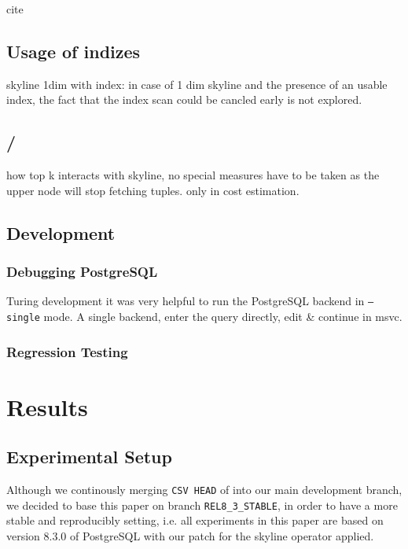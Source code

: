 cite \citep{Buchta1989}

\section{Usage of indizes}
skyline 1dim with index: in case of 1 dim skyline and the presence of an usable index, the fact that the index scan could be cancled early is not explored.

\section{ / }
how top k interacts with skyline, no special measures have to be taken as the upper node will stop fetching tuples. only in cost estimation.


\section{Development}
\subsection{Debugging PostgreSQL}
Turing development it was very helpful to run the PostgreSQL backend in \texttt{--single} mode. A single backend, enter the query directly, edit \& continue in msvc.


\subsection{Regression Testing}

\chapter{Results}
\label{chap:Results}


\section{Experimental Setup}

Although we continously merging \texttt{CSV HEAD} of  into our main development branch, we decided
to base this paper on branch \texttt{REL8\_3\_STABLE}, in order to
have a more stable and reproducibly setting, i.e. all experiments in
this paper are based on version 8.3.0 of PostgreSQL with our patch for
the skyline operator applied.

